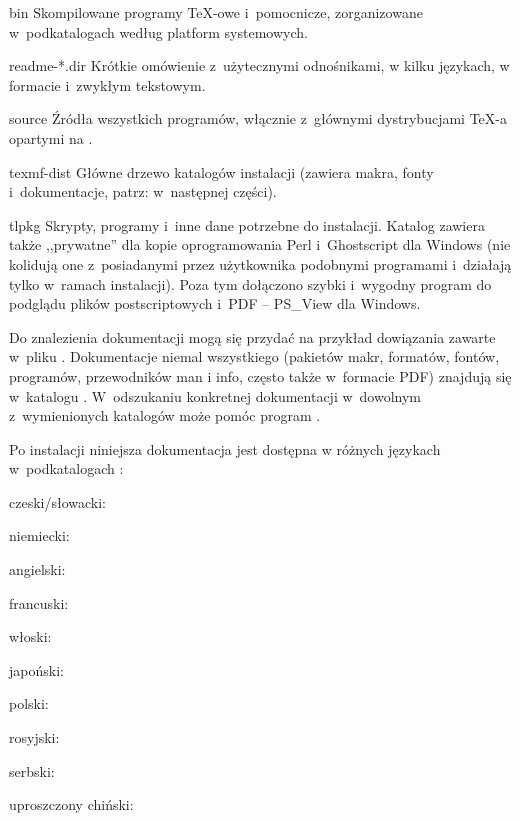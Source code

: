 \documentclass{article}
\begin{document}
\begin{ttdescription}
\item[bin] Skompilowane programy \TeX-owe i~pomocnicze, zorganizowane
w~podkatalogach  według platform systemowych.

\item[readme-*.dir] Krótkie omówienie z~użytecznymi odnośnikami,
w kilku językach, w formacie \HTML{} i~zwykłym tekstowym.

\item[source] Źródła wszystkich programów, włącznie z~głównymi dystrybucjami
 \TeX-a opartymi na  \Webc{}.

\item[texmf-dist] Główne drzewo katalogów instalacji (zawiera makra,
 fonty i~dokumentacje, patrz:  w~następnej części).

\item[tlpkg] Skrypty, programy i~inne dane potrzebne do instalacji.
  Katalog zawiera także ,,prywatne'' dla \TL{} kopie oprogramowania Perl
  i~Ghostscript dla Windows (nie kolidują one z~posiadanymi przez użytkownika
  podobnymi programami i~działają tylko w~ramach instalacji). Poza tym
  dołączono szybki i~wygodny program do podglądu plików postscriptowych i~PDF
  -- PS\_View dla Windows.
\end{ttdescription}
Do znalezienia dokumentacji mogą się przydać na przykład dowiązania zawarte
w~pliku . Dokumentacje niemal wszystkiego (pakietów makr,
formatów, fontów, programów, przewodników man i info, często także w~formacie
PDF) znajdują się w~katalogu . W~odszukaniu
konkretnej dokumentacji w~dowolnym z~wymienionych
katalogów może pomóc program .


Po instalacji niniejsza dokumentacja jest dostępna w różnych językach
w~podkatalogach :

\begin{itemize*}
\item{czeski/słowacki:} 
\item{niemiecki:} 
\item{angielski:} 
\item{francuski:} 
\item{włoski:} 
\item{japoński:} 
\item{polski:} 
\item{rosyjski:} 
\item{serbski:} 
\item{uproszczony chiński:} 
\end{itemize*}
\end{document}
